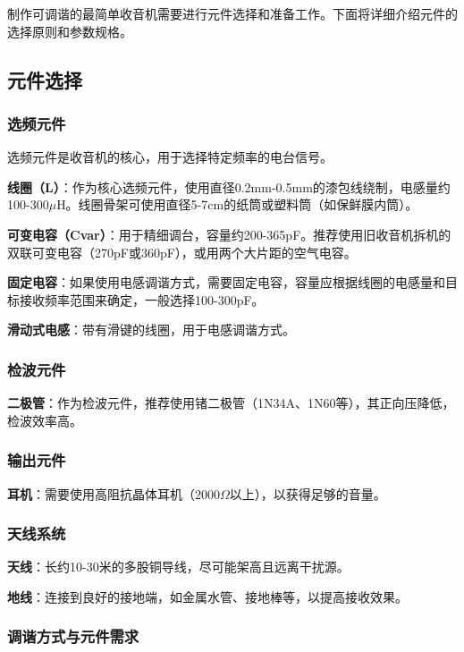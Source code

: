\documentclass[12pt,UTF8]{ctexbook}
\begin{document}
制作可调谐的最简单收音机需要进行元件选择和准备工作。下面将详细介绍元件的选择原则和参数规格。

\subsection{元件选择}

\subsubsection{选频元件}

选频元件是收音机的核心，用于选择特定频率的电台信号。

\textbf{线圈（L）}：作为核心选频元件，使用直径0.2mm-0.5mm的漆包线绕制，电感量约100-300$\mu$H。线圈骨架可使用直径5-7cm的纸筒或塑料筒（如保鲜膜内筒）。

\textbf{可变电容（Cvar）}：用于精细调台，容量约200-365pF。推荐使用旧收音机拆机的双联可变电容（270pF或360pF），或用两个大片距的空气电容。

\textbf{固定电容}：如果使用电感调谐方式，需要固定电容，容量应根据线圈的电感量和目标接收频率范围来确定，一般选择100-300pF。

\textbf{滑动式电感}：带有滑键的线圈，用于电感调谐方式。

\subsubsection{检波元件}

\textbf{二极管}：作为检波元件，推荐使用锗二极管（1N34A、1N60等），其正向压降低，检波效率高。

\subsubsection{输出元件}

\textbf{耳机}：需要使用高阻抗晶体耳机（2000$\Omega$以上），以获得足够的音量。

\subsubsection{天线系统}

\textbf{天线}：长约10-30米的多股铜导线，尽可能架高且远离干扰源。

\textbf{地线}：连接到良好的接地端，如金属水管、接地棒等，以提高接收效果。

\subsubsection{调谐方式与元件需求}
\end{document}
